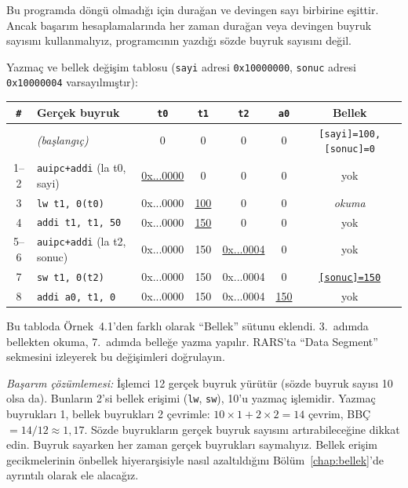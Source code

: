 \begin{ornek}[4.2]
Bu programda döngü olmadığı için durağan ve devingen sayı birbirine eşittir. Ancak başarım hesaplamalarında her zaman durağan veya devingen buyruk sayısını kullanmalıyız, programcının yazdığı sözde buyruk sayısını değil.

Yazmaç ve bellek değişim tablosu (\texttt{sayi} adresi \texttt{0x10000000}, \texttt{sonuc} adresi \texttt{0x10000004} varsayılmıştır):

\begin{center}
\small
\begin{tabular}{clccccc}
\toprule
\texttt{\#} & Gerçek buyruk & \texttt{t0} & \texttt{t1} & \texttt{t2} & \texttt{a0} & Bellek \\
\midrule
   & \emph{(başlangıç)} & 0 & 0 & 0 & 0 & \texttt{[sayi]=100, [sonuc]=0} \\
1--2 & \texttt{auipc+addi} (la t0, sayi) & \underline{0x...0000} & 0 & 0 & 0 & yok \\
3 & \texttt{lw t1, 0(t0)} & 0x...0000 & \underline{100} & 0 & 0 & \emph{okuma} \\
4 & \texttt{addi t1, t1, 50} & 0x...0000 & \underline{150} & 0 & 0 & yok \\
5--6 & \texttt{auipc+addi} (la t2, sonuc) & 0x...0000 & 150 & \underline{0x...0004} & 0 & yok \\
7 & \texttt{sw t1, 0(t2)} & 0x...0000 & 150 & 0x...0004 & 0 & \underline{\texttt{[sonuc]=150}} \\
8 & \texttt{addi a0, t1, 0} & 0x...0000 & 150 & 0x...0004 & \underline{150} & yok \\
\bottomrule
\end{tabular}
\end{center}

Bu tabloda Örnek~4.1'den farklı olarak ``Bellek'' sütunu eklendi. 3.~adımda bellekten okuma, 7.~adımda belleğe yazma yapılır. RARS'ta ``Data Segment'' sekmesini izleyerek bu değişimleri doğrulayın.

\emph{Başarım çözümlemesi:} İşlemci 12 gerçek buyruk yürütür (sözde buyruk sayısı 10 olsa da). Bunların 2'si bellek erişimi (\texttt{lw}, \texttt{sw}), 10'u yazmaç işlemidir. Yazmaç buyrukları 1, bellek buyrukları 2 çevrimle: $10 \times 1 + 2 \times 2 = 14$ çevrim, BBÇ~$= 14/12 \approx 1{,}17$. Sözde buyrukların gerçek buyruk sayısını artırabileceğine dikkat edin. Buyruk sayarken her zaman gerçek buyrukları saymalıyız. Bellek erişim gecikmelerinin önbellek hiyerarşisiyle nasıl azaltıldığını Bölüm~\ref{chap:bellek}'de ayrıntılı olarak ele alacağız.
\end{ornek}

